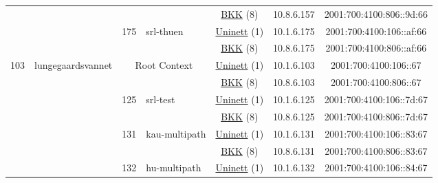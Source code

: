 \begin{small}
\begin{center}
\begin{longtable}{|c|c|c|c|c|c|c|c|}
  &  &  &  & \multicolumn{2}{|c|}{\tiny{\href{http://bkk.no}{BKK} (8)}} & \tiny{10.8.6.157} & \tiny{2001:700:4100:806::9d:66} \\* \cline{3-3}\cline{4-4}\cline{5-5}\cline{6-6}\cline{7-7}\cline{8-8}
  &  & \multirow{2}{*}{\tiny{175}} & \multicolumn{1}{|l|}{\multirow{2}{*}{\tiny{srl-thuen}}} & \multicolumn{2}{|c|}{\tiny{\href{https://www.uninett.no}{Uninett} (1)}} & \tiny{10.1.6.175} & \tiny{2001:700:4100:106::af:66} \\* \cline{5-5}\cline{6-6}\cline{7-7}\cline{8-8}
  &  &  &  & \multicolumn{2}{|c|}{\tiny{\href{http://bkk.no}{BKK} (8)}} & \tiny{10.8.6.175} & \tiny{2001:700:4100:806::af:66} \\ \hline
 \multirow{22}{*}{\tiny{103}} & \multicolumn{1}{|l|}{\multirow{22}{*}{\tiny{lungegaardsvannet}}} & \multicolumn{2}{|c|}{\multirow{2}{*}{\tiny{Root Context}}} & \multicolumn{2}{|c|}{\tiny{\href{https://www.uninett.no}{Uninett} (1)}} & \tiny{10.1.6.103} & \tiny{2001:700:4100:106::67} \\* \cline{5-5}\cline{6-6}\cline{7-7}\cline{8-8}
  &  & \multicolumn{2}{|c|}{} & \multicolumn{2}{|c|}{\tiny{\href{http://bkk.no}{BKK} (8)}} & \tiny{10.8.6.103} & \tiny{2001:700:4100:806::67} \\* \cline{3-3}\cline{4-4}\cline{5-5}\cline{6-6}\cline{7-7}\cline{8-8}
  &  & \multirow{2}{*}{\tiny{125}} & \multicolumn{1}{|l|}{\multirow{2}{*}{\tiny{srl-test}}} & \multicolumn{2}{|c|}{\tiny{\href{https://www.uninett.no}{Uninett} (1)}} & \tiny{10.1.6.125} & \tiny{2001:700:4100:106::7d:67} \\* \cline{5-5}\cline{6-6}\cline{7-7}\cline{8-8}
  &  &  &  & \multicolumn{2}{|c|}{\tiny{\href{http://bkk.no}{BKK} (8)}} & \tiny{10.8.6.125} & \tiny{2001:700:4100:806::7d:67} \\* \cline{3-3}\cline{4-4}\cline{5-5}\cline{6-6}\cline{7-7}\cline{8-8}
  &  & \multirow{2}{*}{\tiny{131}} & \multicolumn{1}{|l|}{\multirow{2}{*}{\tiny{kau-multipath}}} & \multicolumn{2}{|c|}{\tiny{\href{https://www.uninett.no}{Uninett} (1)}} & \tiny{10.1.6.131} & \tiny{2001:700:4100:106::83:67} \\* \cline{5-5}\cline{6-6}\cline{7-7}\cline{8-8}
  &  &  &  & \multicolumn{2}{|c|}{\tiny{\href{http://bkk.no}{BKK} (8)}} & \tiny{10.8.6.131} & \tiny{2001:700:4100:806::83:67} \\* \cline{3-3}\cline{4-4}\cline{5-5}\cline{6-6}\cline{7-7}\cline{8-8}
  &  & \multirow{2}{*}{\tiny{132}} & \multicolumn{1}{|l|}{\multirow{2}{*}{\tiny{hu-multipath}}} & \multicolumn{2}{|c|}{\tiny{\href{https://www.uninett.no}{Uninett} (1)}} & \tiny{10.1.6.132} & \tiny{2001:700:4100:106::84:67} \\* \cline{5-5}\cline{6-6}\cline{7-7}\cline{8-8}

\end{longtable}
\end{center}
\end{small}
